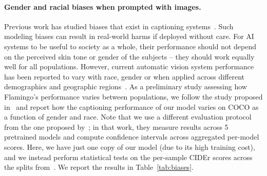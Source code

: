 \begin{table}
\centering
{}
\vspace{1em}
\caption{\capfontsize{} \textbf{Bias evaluation of \largem{} for COCO captioning.} We report results on the COCO dataset splits over gender and skin tone provided by~\citet{zhao2021understanding}.}
\label{tab:biases}
\end{table}

\paragraph{Gender and racial biases when prompted with images.}
Previous work has studied biases that exist in captioning systems~\citep{hendricks2018women,zhao2021understanding}.
Such modeling biases can result in real-world harms if deployed without care.
For AI systems to be useful to society as a whole, their performance should not depend on the perceived skin tone or gender of the subjects -- they should work equally well for all populations.
However, current automatic vision system performance has been reported to vary with race, gender or when applied across different demographics and geographic regions~\citep{buolamwini2018gender,de2019does,schwemmer2020diagnosing}.
As a preliminary study assessing how Flamingo's performance varies between populations, we follow the study proposed in~\citet{zhao2021understanding} and report how the captioning performance of our model varies on COCO as a function of gender and race.
Note that we use a different evaluation protocol from the one proposed by~\citet{zhao2021understanding}; in that work, they measure results across 5 pretrained models and compute confidence intervals across aggregated per-model scores.
Here, we have just one copy of our model (due to its high training cost), and we instead perform statistical tests on the per-sample CIDEr scores across the splits from~\citet{zhao2021understanding}.
We report the results in Table~\ref{tab:biases}.

